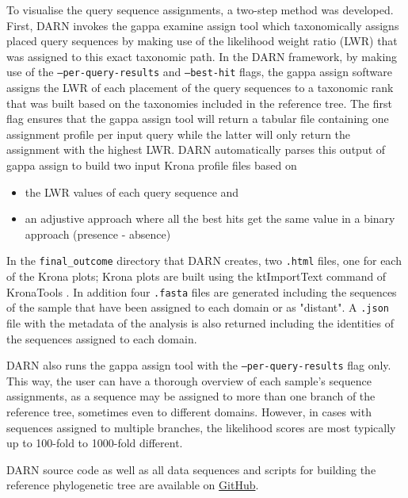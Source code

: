    To visualise the query sequence assignments, a two-step method was developed. 
   First, DARN invokes the gappa examine assign tool which taxonomically assigns placed query sequences by making use of the likelihood weight ratio (LWR) that was assigned to this exact taxonomic path. 
   In the DARN framework, by making use of the \texttt{--per-query-results} and \texttt{--best-hit} flags, the gappa assign software assigns the LWR of each placement of the query sequences to a taxonomic rank that was built based on the taxonomies included in the reference tree. 
   The first flag ensures that the gappa assign tool will return a tabular file containing one assignment profile per input query while the latter will only return the assignment with the highest LWR. 
   DARN automatically parses this output of gappa assign to build two input Krona profile files based on 

   \begin{itemize}
      \item the LWR values of each query sequence and
      \item an adjustive approach where all the best hits get the same value in a binary approach (presence - absence)
   \end{itemize}
   
   In the \texttt{final\_outcome} directory that DARN creates, two \texttt{.html} files, one for each of the Krona plots; 
   Krona plots are built using the ktImportText command of KronaTools \citep{ondov2011interactive}. 
   In addition four \texttt{.fasta} files are generated including the sequences of the sample that have been assigned to each domain or as "distant". 
   A \texttt{.json} file with the metadata of the analysis is also returned including the identities of the sequences assigned to each domain.

   DARN also runs the gappa assign tool with the \texttt{--per-query-results} flag only. 
   This way, the user can have a thorough overview of each sample’s sequence assignments, as a sequence may be assigned to more than one branch of the reference tree, sometimes even to different domains. 
   However, in cases with sequences assigned to multiple branches, the likelihood scores are most typically up to 100-fold to 1000-fold different.

   DARN source code as well as all data sequences and scripts for building the reference phylogenetic tree are available on \href{https://github.com/hariszaf/darn}{GitHub}.



